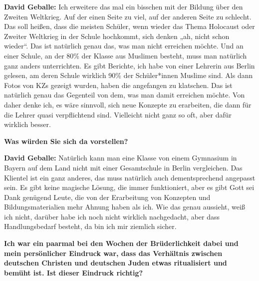 \textbf{David Geballe:} Ich erweitere das mal ein bisschen mit der Bildung über den Zweiten Weltkrieg. Auf der einen Seite zu viel, auf der anderen Seite zu schlecht. Das soll heißen, dass die meisten Schüler, wenn wieder das Thema Holocaust oder Zweiter Weltkrieg in der Schule hochkommt, sich denken „ah, nicht schon wieder“. Das ist natürlich genau das, was man nicht erreichen möchte. Und an einer Schule, an der 80\% der Klasse aus Muslimen besteht, muss man natürlich ganz anders unterrichten. Es gibt Berichte, ich habe von einer Lehrerin aus Berlin gelesen, am deren Schule wirklich 90\% der Schüler*innen Muslime sind. Als dann Fotos von KZs gezeigt wurden, haben die angefangen zu klatschen. Das ist natürlich genau das Gegenteil von dem, was man damit erreichen möchte. Von daher denke ich, es wäre sinnvoll, sich neue Konzepte zu erarbeiten, die dann für die Lehrer quasi verpflichtend sind. Vielleicht nicht ganz so oft, aber dafür wirklich besser. 

\textbf{Was würden Sie sich da vorstellen?} 

\textbf{David Geballe:} Natürlich kann man eine Klasse von einem Gymnasium in Bayern auf dem Land nicht mit einer Gesamtschule in Berlin vergleichen. Das Klientel ist ein ganz anderes, das muss natürlich auch dementsprechend angepasst sein. Es gibt keine magische Lösung, die immer funktioniert, aber es gibt Gott sei Dank genügend Leute, die von der Erarbeitung von Konzepten und Bildungsmaterialien mehr Ahnung haben als ich. Wie das genau aussieht, weiß ich nicht, darüber habe ich noch nicht wirklich nachgedacht, aber dass Handlungsbedarf besteht, da bin ich mir ziemlich sicher. 

\textbf{Ich war ein paarmal bei den Wochen der Brüderlichkeit dabei und mein persönlicher Eindruck war, dass das Verhältnis zwischen deutschen Christen und deutschen Juden etwas ritualisiert und bemüht ist. Ist dieser Eindruck richtig?} 


